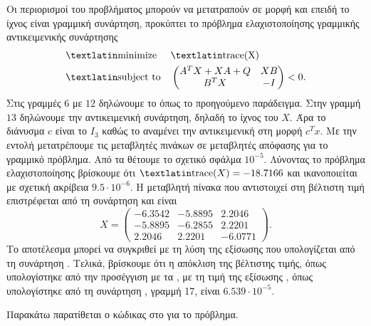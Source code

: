 Οι περιορισμοί του προβλήματος μπορούν να μετατραπούν σε  μορφή και
επειδή το ίχνος είναι γραμμική συνάρτηση, προκύπτει το πρόβλημα ελαχιστοποίησης
γραμμικής αντικειμενικής συνάρτησης
\begin{equation*}
    \begin{aligned}
        & \text{\tl{minimize}} & & \text{\tl{trace(X)}} \\
        & \text{\tl{subject to}} & &
        \begin{pmatrix}
            A^TX + XA + Q & XB \\
            B^TX & -I
        \end{pmatrix} < 0.
    \end{aligned}
\end{equation*}
Στις γραμμές \(6\) με \(12\) δηλώνουμε το  όπως το προηγούμενο παράδειγμα. Στην
γραμμή \(13\) δηλώνουμε την αντικειμενική συνάρτηση, δηλαδή το ίχνος του
\(X\). Άρα το διάνυσμα \(c\) είναι το \(I_3\) καθώς το  αναμένει την
αντικειμενική στη μορφή \(c^Tx\). Με την εντολή  μετατρέπουμε τις
μεταβλητές πινάκων σε μεταβλητές απόφασης για το γραμμικό πρόβλημα. Από τα
 θέτουμε το σχετικό σφάλμα \(10^{-5}\). Λύνοντας το
 πρόβλημα ελαχιστοποίησης βρίσκουμε ότι \( \text{\tl{trace}}(X) =
-18.7166\) και ικανοποιείται με σχετική ακρίβεια \(9.5\cdot10^{-6}\). Η μεταβλητή
πίνακα που αντιστοιχεί στη βέλτιστη τιμή επιστρέφεται από τη συνάρτηση
 και είναι
\begin{equation*}
    X =
    \begin{pmatrix}
        -6.3542 & -5.8895 & 2.2046 \\
        -5.8895 & -6.2855 & 2.2201 \\
        2.2046 & 2.2201 & -6.0771
    \end{pmatrix}.
\end{equation*}
Το αποτέλεσμα μπορεί να συγκριθεί με τη λύση της εξίσωσης  που
υπολογίζεται από τη συνάρτηση . Τελικά, βρίσκουμε ότι η απόκλιση της
βέλτιστης τιμής, όπως υπολογίστηκε από την προσέγγιση με τα , με τη τιμή
της εξίσωσης , όπως υπολογίστηκε από τη συνάρτηση ,
γραμμή 17, είναι \(6.539\cdot10^{-5}\).

Παρακάτω παρατίθεται ο κώδικας στο  για το πρόβλημα.
\begin{otherlanguage}{english}
    
\end{otherlanguage}
